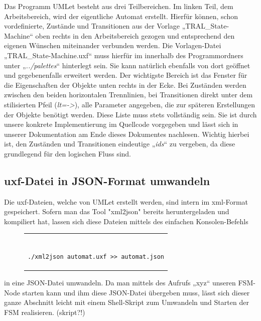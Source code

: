 Das Programm UMLet besteht aus drei Teilbereichen. Im linken Teil, dem
Arbeitsbereich, wird der eigentliche Automat erstellt. Hierfür können, schon
vordefinierte, Zustände und Transitionen aus der Vorlage „TRAL\_State-Machine“
oben rechts in den Arbeitsbereich gezogen und entsprechend den eigenen Wünschen
miteinander verbunden werden. Die Vorlagen-Datei „TRAL\_State-Machine.uxf“ muss
hierfür im innerhalb des Programmordners unter „\textit{../palettes}“ hinterlegt sein.
Sie kann natürlich ebenfalls von dort geöffnet und gegebenenfalls erweitert
werden.
Der wichtigste Bereich ist das Fenster für die Eigenschaften der Objekte unten rechts in der Ecke.
Bei Zuständen werden zwischen den beiden horizontalen Trennlinien, bei
Transitionen direkt unter dem stilisierten Pfeil (\textit{lt=->}), alle Parameter
angegeben, die zur späteren Erstellungen der Objekte benötigt werden. Diese
Liste muss stets vollständig sein. Sie ist durch unsere konkrete
Implementierung im Quellcode vorgegeben und lässt sich in unserer Dokumentation
am Ende dieses Dokumentes nachlesen.
Wichtig hierbei ist, den Zuständen und Transitionen eindeutige „\textit{ids}“ zu
vergeben, da diese grundlegend für den logischen Fluss sind.


\subsection{uxf-Datei in JSON-Format umwandeln}
Die uxf-Dateien, welche von UMLet erstellt werden, sind intern im xml-Format
gespeichert. Sofern man das Tool "xml2json" bereits heruntergeladen und
kompiliert hat, lassen sich diese Dateien mittels des einfachen Konsolen-Befehls

\begin{figure}[thp]
\begin{tabular}{c}
\begin{lstlisting}[style=json]

./xml2json automat.uxf >> automat.json

\end{lstlisting}
\end{tabular}
\centering
\end{figure}

in eine JSON-Datei umwandeln.
Da man mittels des Aufrufs „xyz“ unseren FSM-Node starten kann und ihm diese
JSON-Datei übergeben muss, lässt sich dieser ganze Abschnitt leicht mit einem
Shell-Skript zum Umwandeln und Starten der FSM realisieren.
(skript?!)


